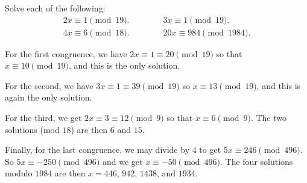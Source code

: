  Solve each of the following:
\begin{gather*}
  2x\equiv1\pmod{19}. \qquad\qquad 3x\equiv1\pmod{19}. \\
  4x\equiv6\pmod{18}. \qquad\qquad 20x\equiv984\pmod{1984}.
\end{gather*}
\begin{solution}
  For the first congruence, we have $2x\equiv1\equiv20\pmod{19}$ so
  that $x\equiv10\pmod{19}$, and this is the only solution.

  For the second, we have $3x\equiv1\equiv39\pmod{19}$ so
  $x\equiv13\pmod{19}$, and this is again the only solution.

  For the third, we get $2x\equiv3\equiv12\pmod9$ so that
  $x\equiv6\pmod9$. The two solutions (mod $18$) are then $6$ and
  $15$.

  Finally, for the last congruence, we may divide by $4$ to get
  $5x\equiv246\pmod{496}$. So $5x\equiv-250\pmod{496}$ and we get
  $x\equiv-50\pmod{496}$. The four solutions modulo $1984$ are then
  $x = 446$, $942$, $1438$, and $1934$.
\end{solution}

